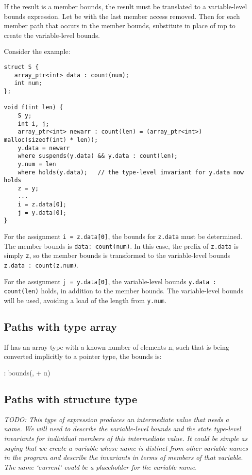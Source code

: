 If the result is a member bounds, the result must be translated to a
variable-level bounds expression. Let  be  with the
last member access removed. Then for each member path  that
occurs in the member bounds, substitute  in place of mp
to create the variable-level bounds.

Consider the example:
\begin{verbatim}
struct S {
   array_ptr<int> data : count(num);
   int num;
};

void f(int len) {
    S y;
    int i, j;
    array_ptr<int> newarr : count(len) = (array_ptr<int>) malloc(sizeof(int) * len));
    y.data = newarr
    where suspends(y.data) && y.data : count(len);
    y.num = len
    where holds(y.data);   // the type-level invariant for y.data now holds
    z = y;
    ...
    i = z.data[0];
    j = y.data[0];
}
\end{verbatim}

For the assignment \texttt{i = z.data[0]}, the bounds for
\texttt{z.data} must be determined. The member bounds is \texttt{data:
count(num)}. In this case, the prefix of \texttt{z.data} is simply
\texttt{z}, so the member bounds is transformed to the variable-level
bounds \texttt{z.data : count(z.num)}.

For the assignment \texttt{j = y.data[0]}, the variable-level bounds
\texttt{y.data : count(len)} holds, in addition to the member bounds.
The variable-level bounds will be used, avoiding a load of the length
from \texttt{y.num}.

\subsection{Paths with type array}

If  has an array type with a known number of elements n,
such that  is being converted implicitly to a pointer type,
the bounds is:

 : bounds(,  + n)

\subsection{Paths with structure type}

\emph{TODO: This type of expression produces an intermediate value that
needs a name. We will need to describe the variable-level bounds and the
state type-level invariants for individual members of this intermediate
value. It could be simple as saying that we create a variable whose name
is distinct from other variable names in the program and describe the
invariants in terms of members of that variable. The name `current'
could be a placeholder for the variable name.}

